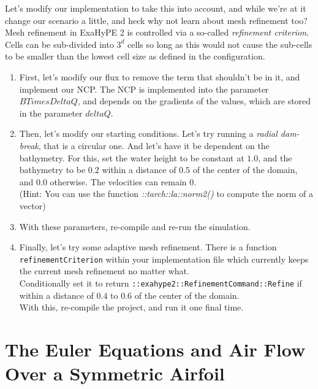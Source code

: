 \documentclass[12pt,letterpaper]{article}
\begin{document}
Let's modify our implementation to take this into account, and while we're at it change our scenario a little, and heck why not learn about mesh refinement too?\\
Mesh refinement in ExaHyPE 2 is controlled via a so-called \textit{refinement criterion}.
Cells can be sub-divided into $3^d$ cells so long as this would not cause the sub-cells to be smaller than the lowest cell size as defined in the configuration.

\begin{enumerate}
    \item
        First, let's modify our flux to remove the term that shouldn't be in it, and implement our NCP.
        The NCP is implemented into the parameter $BTimesDeltaQ$, and depends on the gradients of the values, which are stored in the parameter $deltaQ$.
    \item
        Then, let's modify our starting conditions. Let's try running a \textit{radial dam-break}, that is a circular one.
        And let's have it be dependent on the bathymetry.
        For this, set the water height to be constant at $1.0$, and the bathymetry to be $0.2$ within a distance of $0.5$ of the center of the domain,
        and $0.0$ otherwise. The velocities can remain $0$.\\
        (Hint: You can use the function \textit{::tarch::la::norm2()} to compute the norm of a vector)
    \item
        With these parameters, re-compile and re-run the simulation.
    \item
        Finally, let's try some adaptive mesh refinement. There is a function \texttt{refinementCriterion} within your implementation file which
        currently keeps the current mesh refinement no matter what.\\
        Conditionally set it to return \texttt{::exahype2::RefinementCommand::Refine} if within a distance of $0.4$ to $0.6$ of the center of the domain.\\
        With this, re-compile the project, and run it one final time.
\end{enumerate}

\newpage

\section{The Euler Equations and Air Flow Over a Symmetric Airfoil}
\label{refinement}

\vspace{0.2cm}
\end{document}
